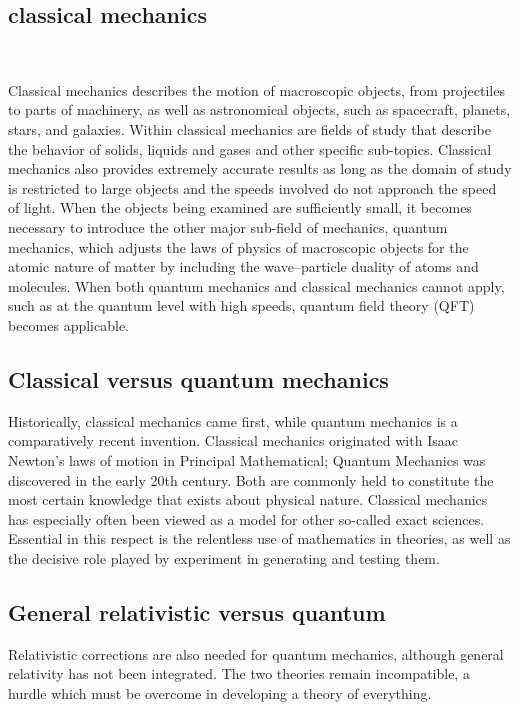 \documentclass[12pt,a4paper]{article}
\begin{document}
\begin{titlepage}

\section{classical mechanics}
\

Classical mechanics describes the motion of macroscopic objects, from projectiles to parts of machinery, as well as astronomical objects, such as spacecraft, planets, stars, and galaxies. Within classical mechanics are fields of study that describe the behavior of solids, liquids and gases and other specific sub-topics. Classical mechanics also provides extremely accurate results as long as the domain of study is restricted to large objects and the speeds involved do not approach the speed of light. When the objects being examined are sufficiently small, it becomes necessary to introduce the other major sub-field of mechanics, quantum mechanics, which adjusts the laws of physics of macroscopic objects for the atomic nature of matter by including the wave–particle duality of atoms and molecules. When both quantum mechanics and classical mechanics cannot apply, such as at the quantum level with high speeds, quantum field theory (QFT) becomes applicable.


\subsection{Classical versus quantum mechanics}

Historically, classical mechanics came first, while quantum mechanics is a comparatively recent invention. Classical mechanics originated with Isaac Newton's laws of motion in Principal Mathematical; Quantum Mechanics was discovered in the early 20th century. Both are commonly held to constitute the most certain knowledge that exists about physical nature. Classical mechanics has especially often been viewed as a model for other so-called exact sciences. Essential in this respect is the relentless use of mathematics in theories, as well as the decisive role played by experiment in generating and testing them.



\subsection{General relativistic versus quantum}

Relativistic corrections are also needed for quantum mechanics, although general relativity has not been integrated. The two theories remain incompatible, a hurdle which must be overcome in developing a theory of everything.


\end{titlepage}
\end{document}
